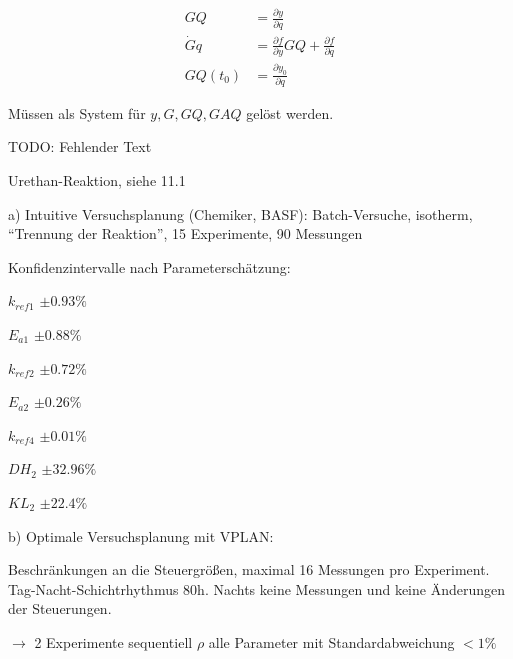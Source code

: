 \begin{align*}
GQ &= \frac{\partial y}{\partial q} \\
\dot Gq &= \frac{\partial f}{\partial y} GQ + \frac{\partial f}{\partial q} \\
GQ(t_0) &= \frac{\partial y_0}{\partial q}
\end{align*}

Müssen als System für $y,G,GQ, GAQ$ gelöst werden.

TODO: Fehlender Text



Urethan-Reaktion, siehe 11.1

a) Intuitive Versuchsplanung (Chemiker, BASF): Batch-Versuche, isotherm, "`Trennung der Reaktion"', 15 Experimente, 90 Messungen

Konfidenzintervalle nach Parameterschätzung:

\bitm
\item $k_{ref1}$ $\pm 0.93\%$
\item $E_{a1}$ $\pm 0.88\%$
\item $k_{ref2}$ $\pm 0.72\%$
\item $E_{a2}$ $\pm 0.26\%$
\item $k_{ref4}$ $\pm 0.01\%$
\item $DH_2$ $\pm 32.96\%$
\item $KL_2$ $\pm 22.4\%$
\eitm

b) Optimale Versuchsplanung mit VPLAN:

Beschränkungen an die Steuergrößen, maximal 16 Messungen pro Experiment. Tag-Nacht-Schichtrhythmus 80h. Nachts keine Messungen und keine Änderungen der Steuerungen.

$\to$ 2 Experimente sequentiell $\rho$ alle Parameter mit Standardabweichung $< 1\%$

